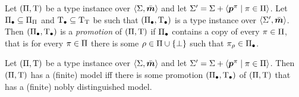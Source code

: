 \begin{definition}
Let $(\Pi,\mathrm{T})$ be a type instance over $\left\langle \mathrm{\Sigma},\bar{\bm{m}} \right\rangle$ and let
$\mathrm{\Sigma'} = \mathrm{\Sigma} + \left\langle \bm{p}^{\pi} \mathrel{}\middle|\mathrel{} \pi \in \Pi \right\rangle$.
Let $\Pi_{\bullet} \subseteq {\Pi}_{\Pi}$ and $\mathrm{T}_{\bullet} \subseteq {\mathrm{T}}_{\mathrm{T}}$ be
such that $(\Pi_{\bullet},\mathrm{T}_{\bullet})$ is a type instance over $\left\langle \mathrm{\Sigma'},\bar{\bm{m}} \right\rangle$.
Then $(\Pi_{\bullet},\mathrm{T}_{\bullet})$ is a \emph{promotion} of $(\Pi,\mathrm{T})$ if
$\Pi_{\bullet}$ contains a copy of every $\pi \in \Pi$, 
that is for every $\pi \in \Pi$ there is some $\rho \in
\Pi\cup\left\{\bot\right\}$ such that ${\pi}_{\rho} \in \Pi_{\bullet}$.
\end{definition}
\begin{lemma}\label{lem:noble-distinguishability}
Let $(\Pi,\mathrm{T})$ be a type instance over $\left\langle \mathrm{\Sigma},\bar{\bm{m}} \right\rangle$ and let
$\mathrm{\Sigma'} = \mathrm{\Sigma} + \left\langle \bm{p}^{\pi} \mathrel{}\middle|\mathrel{} \pi \in \Pi \right\rangle$.
Then $(\Pi,\mathrm{T})$ has a (finite) model iff there is some promotion
$(\Pi_{\bullet},\mathrm{T}_{\bullet})$ of $(\Pi,\mathrm{T})$ that has a (finite) nobly distinguished
model.
\end{lemma}
